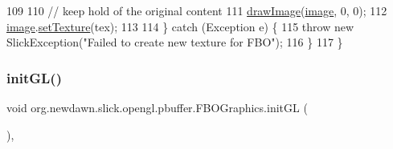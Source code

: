 \begin{DoxyCode}
109             
110             \textcolor{comment}{// keep hold of the original content}
111             \mbox{\hyperlink{classorg_1_1newdawn_1_1slick_1_1_graphics_a2683a74a9890eb1a58999d397c19a0f0}{drawImage}}(\mbox{\hyperlink{classorg_1_1newdawn_1_1slick_1_1opengl_1_1pbuffer_1_1_f_b_o_graphics_a7c88e67ddd520ec76bdc0082285ae909}{image}}, 0, 0);
112             \mbox{\hyperlink{classorg_1_1newdawn_1_1slick_1_1opengl_1_1pbuffer_1_1_f_b_o_graphics_a7c88e67ddd520ec76bdc0082285ae909}{image}}.\mbox{\hyperlink{classorg_1_1newdawn_1_1slick_1_1_image_a73b8afaa9bb100680f5bec87f4a75cdb}{setTexture}}(tex);
113             
114         \} \textcolor{keywordflow}{catch} (Exception e) \{
115             \textcolor{keywordflow}{throw} \textcolor{keyword}{new} SlickException(\textcolor{stringliteral}{"Failed to create new texture for FBO"});
116         \}
117     \}
\end{DoxyCode}
\mbox{\label{classorg_1_1newdawn_1_1slick_1_1opengl_1_1pbuffer_1_1_f_b_o_graphics_a90fe529215a03036496bfa22dc27546d}} 
\subsubsection{\texorpdfstring{init\+G\+L()}{initGL()}}
{\footnotesize\ttfamily void org.\+newdawn.\+slick.\+opengl.\+pbuffer.\+F\+B\+O\+Graphics.\+init\+GL (\begin{DoxyParamCaption}{ }\end{DoxyParamCaption})\hspace{0.3cm}{\ttfamily [inline]}, {\ttfamily [protected]}}

